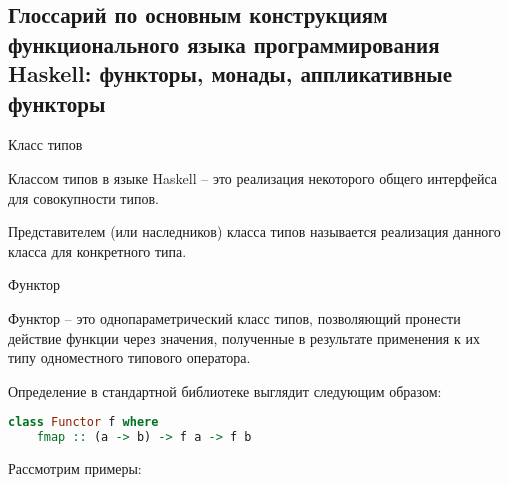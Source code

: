 \subsection{Глоссарий по основным конструкциям функционального языка программирования Haskell: функторы, монады, аппликативные функторы}

\begin{defin} Класс типов

  Классом типов в языке Haskell -- это реализация некоторого общего интерфейса для совокупности типов.

  Представителем (или наследников) класса типов называется реализация данного класса для конкретного типа.
\end{defin}

\begin{defin} Функтор

  Функтор -- это однопараметрический класс типов, позволяющий пронести действие функции через значения,
  полученные в результате применения к их типу одноместного типового оператора.
\end{defin}

Определение в стандартной
библиотеке выглядит следующим образом:

\begin{lstlisting}[language=Haskell]
  class Functor f where
    fmap :: (a -> b) -> f a -> f b
\end{lstlisting}

Рассмотрим примеры:

